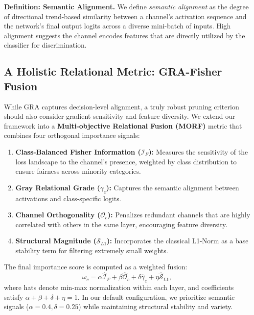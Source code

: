 \documentclass[sn-mathphys,Numbered]{sn-jnl}
\begin{document}
\noindent\textbf{Definition: Semantic Alignment.} We define \emph{semantic alignment} as the degree of directional trend-based similarity between a channel's activation sequence and the network's final output logits across a diverse mini-batch of inputs. High alignment suggests the channel encodes features that are directly utilized by the classifier for discrimination.

\subsection{A Holistic Relational Metric: GRA-Fisher Fusion}
While GRA captures decision-level alignment, a truly robust pruning criterion should also consider gradient sensitivity and feature diversity. We extend our framework into a \textbf{Multi-objective Relational Fusion (MORF)} metric that combines four orthogonal importance signals:

\begin{enumerate}
    \item \textbf{Class-Balanced Fisher Information ($\mathcal{I}_F$):} Measures the sensitivity of the loss landscape to the channel's presence, weighted by class distribution to ensure fairness across minority categories.
    \item \textbf{Gray Relational Grade ($\gamma_c$):} Captures the semantic alignment between activations and class-specific logits.
    \item \textbf{Channel Orthogonality ($\mathcal{O}_c$):} Penalizes redundant channels that are highly correlated with others in the same layer, encouraging feature diversity.
    \item \textbf{Structural Magnitude ($\mathcal{S}_{L1}$):} Incorporates the classical L1-Norm as a base stability term for filtering extremely small weights.
\end{enumerate}

The final importance score is computed as a weighted fusion:
\begin{equation}
\omega_c = \alpha \hat{\mathcal{I}}_F + \beta \hat{\mathcal{O}}_c + \delta \hat{\gamma}_c + \eta \hat{\mathcal{S}}_{L1},
\label{eq:fusion}
\end{equation}
where hats denote min-max normalization within each layer, and coefficients satisfy $\alpha + \beta + \delta + \eta = 1$. In our default configuration, we prioritize semantic signals ($\alpha=0.4, \delta=0.25$) while maintaining structural stability and variety.
\end{document}
